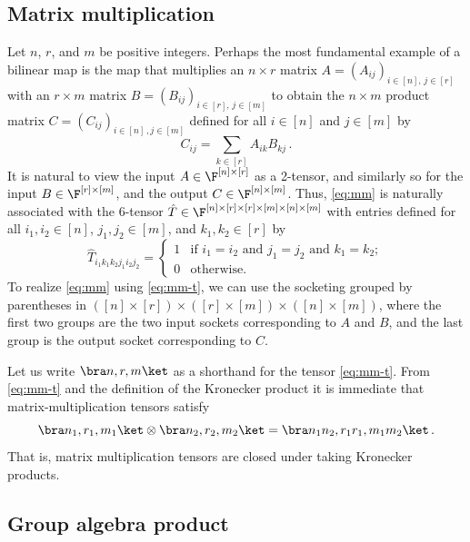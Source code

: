 \subsection{Matrix multiplication}
\label{sect:mm}

Let $n$, $r$, and $m$ be positive integers.
Perhaps the most fundamental example of a bilinear map is the map
that multiplies
an $n\times r$ matrix $A=(A_{ij})_{i\in[n],\,j\in [r]}$ with
an $r\times m$ matrix $B=(B_{ij})_{i\in[r],\,j\in [m]}$
to obtain the $n\times m$ product matrix $C=(C_{ij})_{i\in [n]\,,j\in [m]}$
defined for all $i\in[n]$ and $j\in [m]$ by
\begin{equation}
\label{eq:mm}
C_{ij}=\sum_{k\in[r]} A_{ik}B_{kj}\,.
\end{equation}
It is natural to view the input $A\in\F^{[n]\times [r]}$ as a 2-tensor,
and similarly so for the input $B\in\F^{[r]\times [m]}$, and the
output $C\in\F^{[n]\times [m]}$. Thus, \eqref{eq:mm} is naturally
associated with the 6-tensor
$\hat{T} \in\F^{[n]\times [r]\times [r]\times [m]\times [n]\times [m]}$ with
entries defined for all $i_1,i_2\in [n]$, $j_1, j_2\in[m]$, and
$k_1,k_2\in[r]$ by
\begin{equation}
\label{eq:mm-t}
\hat{T}_{i_1\!k_1\!k_2j_1\!i_2j_2}=
\begin{cases}
1 & \text{if $i_1=i_2$ and $j_1=j_2$ and $k_1=k_2$};\\
0 & \text{otherwise}.
\end{cases}
\end{equation}
To realize \eqref{eq:mm} using \eqref{eq:mm-t}, we can use the socketing
grouped by parentheses in
$([n]\times [r])\times([r]\times [m])\times([n]\times [m])$, where the first
two groups are the two input sockets corresponding to $A$ and $B$,
and the last group is the output socket corresponding to $C$.

Let us write $\bra n,r,m\ket$ as a shorthand for the tensor \eqref{eq:mm-t}.
From \eqref{eq:mm-t} and the definition of the Kronecker product
it is immediate that matrix-multiplication tensors satisfy
\begin{equation}
\label{eq:mm-kron}
\bra n_1,r_1,m_1\ket
\otimes
\bra n_2,r_2,m_2\ket
=
\bra n_1n_2,r_1r_1,m_1m_2\ket\,.
\end{equation}
That is, matrix multiplication tensors are closed under taking  Kronecker products.


\subsection{Group algebra product}

